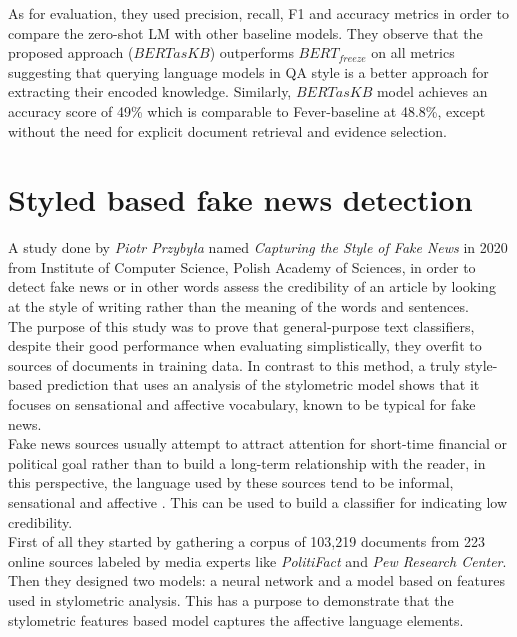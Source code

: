 \documentclass[10pt, english]{report}
\begin{document}
As for evaluation, they used precision, recall, F1 and accuracy metrics in order to compare the zero-shot LM with other baseline models. They observe that the proposed approach ($BERTasKB$) outperforms $BERT_{freeze}$ on all metrics suggesting that querying language models in QA style is a better approach for extracting their encoded knowledge. Similarly, $BERTasKB$ model achieves an accuracy score of 49\% which is comparable to Fever-baseline at 48.8\%, except without the need for explicit document retrieval and evidence selection.


\section{Styled based fake news detection \cite{przybyla2020capturing}}
A study done by \textit{Piotr Przybyła} named \textit{Capturing the Style of Fake News} in 2020 from Institute of Computer Science, Polish Academy of Sciences, in order to detect fake news or in other words assess the credibility of an article by looking at the style of writing rather than the meaning of the words and sentences.\\
The purpose of this study was to prove that general-purpose text classifiers, despite their good performance when evaluating simplistically, they overfit to sources of documents in training data. In contrast to this method, a truly style-based prediction that uses an analysis of the stylometric model shows that it focuses on sensational and affective vocabulary, known to be typical for fake news.\\

Fake news sources usually attempt to attract attention for short-time financial or political goal \cite{allcott2017social} rather than to build a long-term relationship with the reader, in this perspective, the language used by these sources tend to be informal, sensational and affective \cite{bakir2017fake}. This can be used to build a classifier for indicating low credibility.\\

First of all they started by gathering a corpus of 103,219 documents from 223 online sources labeled by media experts like \textit{PolitiFact} and \textit{Pew Research Center}. Then they designed two models: a neural network and a model based on features used in stylometric analysis. This has a purpose to demonstrate that the stylometric features based model captures the affective language elements.\\
\end{document}
